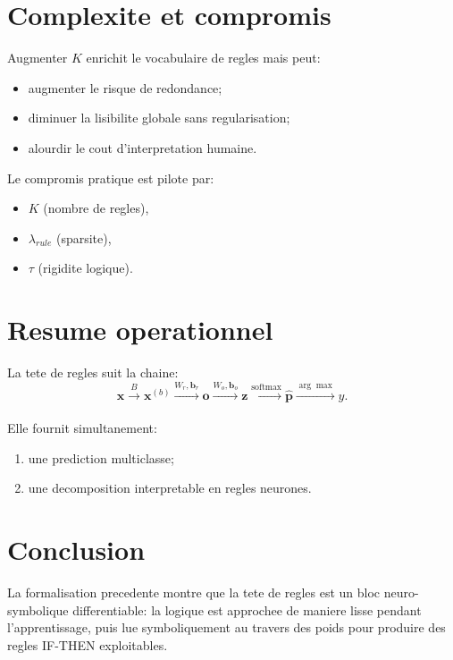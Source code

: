 \documentclass[11pt,a4paper]{article}
\begin{document}
\section{Complexite et compromis}
Augmenter $K$ enrichit le vocabulaire de regles mais peut:
\begin{itemize}
    \item augmenter le risque de redondance;
    \item diminuer la lisibilite globale sans regularisation;
    \item alourdir le cout d'interpretation humaine.
\end{itemize}

Le compromis pratique est pilote par:
\begin{itemize}
    \item $K$ (nombre de regles),
    \item $\lambda_{rule}$ (sparsite),
    \item $\tau$ (rigidite logique).
\end{itemize}

\section{Resume operationnel}
La tete de regles suit la chaine:
\[
\bm{x}\xrightarrow[]{B}\bm{x}^{(b)}
\xrightarrow[]{W_r,\bm{b}_r}\bm{o}
\xrightarrow[]{W_o,\bm{b}_o}\bm{z}
\xrightarrow[]{\text{softmax}}\hat{\bm{p}}
\xrightarrow[]{\arg\max}\hat{y}.
\]

Elle fournit simultanement:
\begin{enumerate}
    \item une prediction multiclasse;
    \item une decomposition interpretable en regles neurones.
\end{enumerate}

\section{Conclusion}
La formalisation precedente montre que la tete de regles est un bloc neuro-symbolique differentiable:
la logique est approchee de maniere lisse pendant l'apprentissage, puis lue symboliquement
au travers des poids pour produire des regles IF-THEN exploitables.
\end{document}
